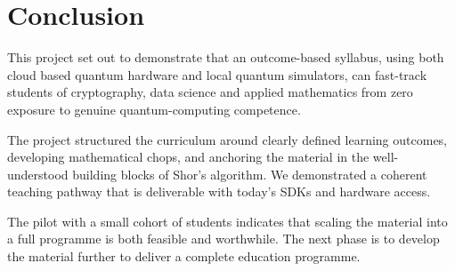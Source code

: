 \section{Conclusion}

This project set out to demonstrate that an outcome-based syllabus,
using both cloud based quantum hardware and local quantum simulators,
can fast-track students of cryptography, data science and applied mathematics
from zero exposure to genuine quantum-computing competence. 

The project structured the curriculum around clearly defined learning outcomes, 
developing mathematical chops, and anchoring the material in the well-understood building blocks 
of Shor's algorithm.  
We demonstrated a coherent teaching pathway that is deliverable with today's SDKs and hardware access.

The pilot with a small cohort of students indicates that scaling the material into a 
full programme is both feasible and worthwhile. 
The next phase is to develop the material further to deliver a complete education programme.








